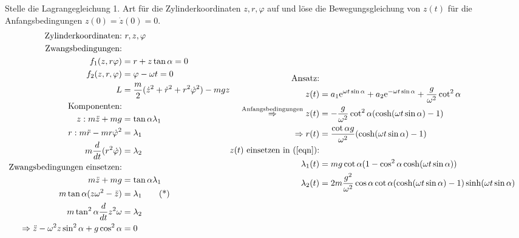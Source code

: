 \begin{enumeralph}
	\item Stelle die Lagrangegleichung 1.  Art für die Zylinderkoordinaten $z,r,\varphi$ auf und löse die Bewegungsgleichung von $z(t)$ für die Anfangsbedingungen $z(0) =   \dot{z}(0) = 0$.
	\begin{subequations}
	\begin{align*}
	\text{Zylinderkoordinaten:}&\ r, z, \varphi\\
	\text{Zwangsbedingungen:}\\
	f_1(z,r\varphi)&=r+z\tan\alpha=0\\
	f_2(z,r,\varphi)&=\varphi-\omega t=0\\
	L&=\frac{m}{2}(\dot{z}^2+\dot{r}^2+r^2\dot{\varphi}^2)-mgz\\
	\text{Komponenten:}\\
	z: m\ddot{z}+mg&=\tan\alpha\lambda_1\\
	r: m\ddot{r} - mr\dot{\varphi}^2&=\lambda_1\\
	m\frac{d}{dt}(r^2\dot{\varphi})&=\lambda_2\\
	\text{Zwangsbedingungen einsetzen:}\\
	m\ddot{z}+mg&=\tan\alpha\lambda_1\\
	m\tan\alpha(z\omega^2-\ddot{z})&=\lambda_1\tag{*} \label{eqn}\\
	m\tan^2\alpha\frac{d}{dt}z^2\omega&=\lambda_2\\
	\Rightarrow \ddot{z}-\omega^2z\sin^2\alpha+g\cos^2\alpha&=0\\
	\end{align*}
	\begin{align*}
	\text{Ansatz:}\\
	z(t)&=a_1\mathrm{e}^{\omega t\sin\alpha}+a_2\mathrm{e}^{-\omega t\sin\alpha}+\frac{g}{\omega^2}\cot^2\alpha\\
	\overset{\text{Anfangsbedingungen}}{\Rightarrow}z(t)&=-\frac{g}{\omega^2}\cot^2\alpha(\cosh(\omega t\sin\alpha)-1)\\
	\Rightarrow r(t)&=\frac{\cot\alpha g}{\omega^2}(\cosh(\omega t\sin\alpha)-1)\\
	z(t) \text{ einsetzen in (\ref{eqn}):}\\
	\lambda_1(t)&=mg\cot\alpha(1-\cos^2\alpha\cosh(\omega t\sin\alpha))\\
	\lambda_2(t)&=2m\frac{g^2}{\omega^2}\cos\alpha\cot\alpha(\cosh(\omega t\sin\alpha)-1)\sinh(\omega t\sin\alpha)
	\end{align*}
\end{subequations}

\end{enumeralph}
